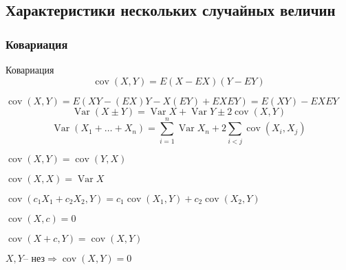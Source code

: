 \documentclass{article}
\DeclareMathOperator{\Var}{Var}
\DeclareMathOperator{\cov}{cov}
\begin{document}
    \subsection{Характеристики нескольких случайных величин}
    \subsubsection{Ковариация}
    \begin{definition}{Ковариация}
        $$ \cov (X, Y) = E(X-EX)(Y-EY)$$
    \end{definition}
    \begin{property}
        $\cov (X, Y) = E(XY - (EX)Y - X(EY) + EXEY) = E(XY) - EXEY$
        $$ \Var(X \pm Y) = \Var X + \Var Y \pm 2 \cov(X, Y)$$
        $$ \Var(X_1 + \dots  + X_n) = \sum\limits_{i=1}^n \Var X_n + 2 \sum\limits_{i < j}\cov(X_i, X_j)$$
    \end{property}
    \begin{property}
        $\cov  (X, Y) = \cov (Y, X)$
    \end{property}
    \begin{property}
        $\cov (X, X) = \Var X$
    \end{property}
    \begin{property}
        $\cov (c_1X_1 + c_2X_2, Y) = c_1 \cov (X_1, Y)  + c_2 \cov(X_2, Y)$
    \end{property}
    \begin{property}
        $\cov (X, c) = 0$
    \end{property}
    \begin{property}
        $\cov(X+c, Y) = \cov (X, Y)$
    \end{property}
    \begin{property}
        $X, Y \text {-- нез} \Rightarrow \cov(X, Y) = 0 $
    \end{property}
\end{document}
